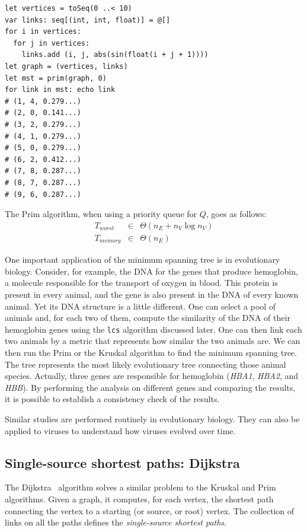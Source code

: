 \documentclass[justified, sixbynine]{tufte-book}
\def\ft{\small\tt}
\theoremstyle{plain}%
\newtheorem * {corollary}{Corollary}
\theoremstyle{definition}
\theoremstyle{remark}
\newtheorem * {remark}{Remark}
\newtheorem * {note}{Note}
\begin{document}
\begin{fullwidth}
\begin{lstlisting}
let vertices = toSeq(0 ..< 10)
var links: seq[(int, int, float)] = @[]
for i in vertices:
  for j in vertices:
    links.add (i, j, abs(sin(float(i + j + 1))))
let graph = (vertices, links)
let mst = prim(graph, 0)
for link in mst: echo link
# (1, 4, 0.279...)
# (2, 0, 0.141...)
# (3, 2, 0.279...)
# (4, 1, 0.279...)
# (5, 0, 0.279...)
# (6, 2, 0.412...)
# (7, 8, 0.287...)
# (8, 7, 0.287...)
# (9, 6, 0.287...)
\end{lstlisting}

The Prim algorithm, when using a priority queue for $Q$, goes as follows:
\begin{eqnarray}
T_{worst} &\in &\Theta (n_E+n_V\log n_V) \\
T_{memory} &\in &\Theta (n_E)
\end{eqnarray}

One important application of the minimum spanning tree is in evolutionary biology. Consider, for example, the DNA for the genes that produce hemoglobin, a molecule responsible for the transport of oxygen in blood. This protein is present in every animal, and the gene is also present in the DNA of every known animal. Yet its DNA structure is a little different. One can select a pool of animals and, for each two of them, compute the similarity of the DNA of their hemoglobin genes using the {\ft lcs} algorithm discussed later. One can then link each two animals by a metric that represents how similar the two animals are. We can then run the Prim or the Kruskal algorithm to find the minimum spanning tree. The tree represents the most likely evolutionary tree connecting those animal species. Actually, three genes are responsible for hemoglobin ({\it HBA1}, {\it HBA2}, and {\it HBB}). By performing the analysis on different genes and comparing the results, it is possible to establish a consistency check of the results.~\cite{evolutionary}

Similar studies are performed routinely in evolutionary biology. They can also be applied to viruses to understand how viruses evolved over time.~\cite{korber}

\subsection{Single-source shortest paths: Dijkstra}


The Dijkstra~\cite{dijkstra} algorithm solves a similar problem to the Kruskal and Prim algorithms. Given a graph, it computes, for each vertex, the shortest path connecting the vertex to a starting (or source, or root) vertex. The collection of links on all the paths defines the {\it single-source shortest paths}.


\end{fullwidth}
\end{document}
